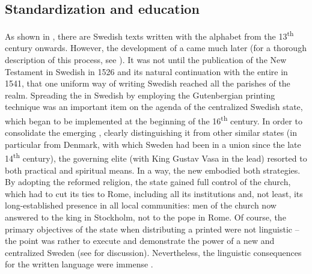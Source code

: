 \documentclass[output=paper]{langscibook}
\begin{document}
\subsection{Standardization and education}\label{sec:intro:2.1}


As shown in , there are Swedish texts written with the  alphabet from the 13\textsuperscript{th} century onwards. However, the development of a  came much later (for a thorough description of this process, see \citealt{Teleman2002}). It was not until the publication of the New Testament in Swedish in 1526 and its natural continuation with the entire  in 1541, that one uniform way of writing Swedish reached all the parishes of the realm. Spreading the  in Swedish by employing the Gutenbergian printing technique was an important item on the agenda of the centralized Swedish state, which began to be implemented at the beginning of the 16\textsuperscript{th} century. In order to consolidate the emerging , clearly distinguishing it from other similar states (in particular from Denmark, with which Sweden had been in a union since the late 14\textsuperscript{th} century), the governing elite (with King Gustav Vasa in the lead) resorted to both practical and spiritual means. In a way, the new  embodied both strategies. By adopting the reformed religion, the state gained full control of the church, which had to cut its ties to Rome, including all its institutions and, not least, its long-established presence in all local communities: men of the church now answered to the king in Stockholm, not to the pope in Rome. Of course, the primary objectives of the state when distributing a printed  were not linguistic – the point was rather to execute and demonstrate the power of a new and centralized Sweden (see \citealt{Kouri1994} for discussion). Nevertheless, the linguistic consequences for the written language were immense \parencite{Stahle1970}.
\end{document}
